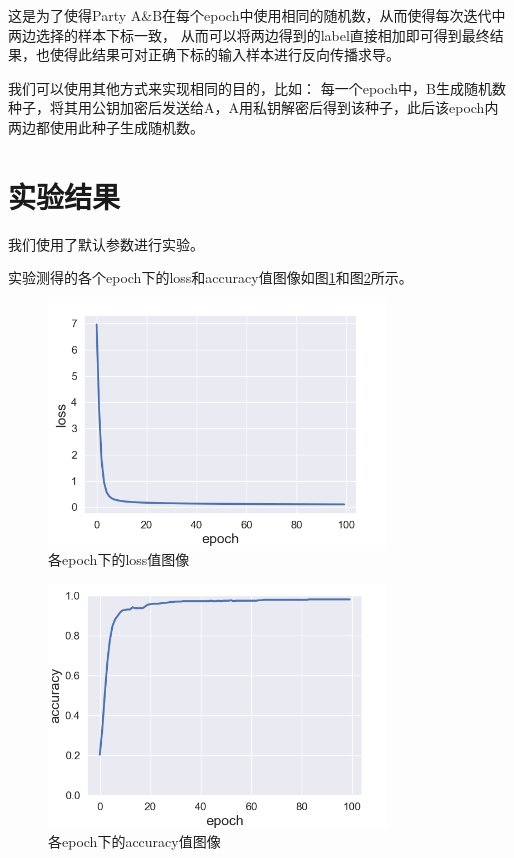 \documentclass[twoside,11pt]{article}
\begin{document}
这是为了使得Party A\&B在每个epoch中使用相同的随机数，从而使得每次迭代中两边选择的样本下标一致，
从而可以将两边得到的label直接相加即可得到最终结果，也使得此结果可对正确下标的输入样本进行反向传播求导。

我们可以使用其他方式来实现相同的目的，比如：
每一个epoch中，B生成随机数种子，将其用公钥加密后发送给A，A用私钥解密后得到该种子，此后该epoch内两边都使用此种子生成随机数。

\section{实验结果}
我们使用了默认参数进行实验。

实验测得的各个epoch下的loss和accuracy值图像如图\ref{fig:loss}和图\ref{fig:acc}所示。

\begin{figure}[htbp]
    \centering
    \includegraphics[width=0.8\textwidth]{pic/loss-plot.png}
    \caption{各epoch下的loss值图像}
    \label{fig:loss}
\end{figure}

\begin{figure}[htbp]
    \centering
    \includegraphics[width=0.8\textwidth]{pic/accuracy-plot.png}
    \caption{各epoch下的accuracy值图像}
    \label{fig:acc}
\end{figure}
\end{document}
